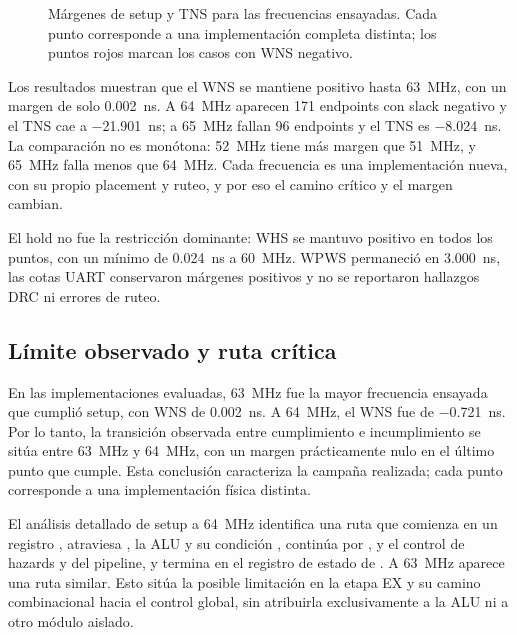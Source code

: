 \begin{figure}[H]
\begin{minipage}{0.48\textwidth}
  \end{minipage}
  \caption{Márgenes de setup y TNS para las frecuencias ensayadas. Cada punto
  corresponde a una implementación completa distinta; los puntos rojos marcan
  los casos con WNS negativo.}
  \label{fig:frecuencia-margenes}
\end{figure}

Los resultados muestran que el WNS se mantiene positivo hasta
\SI{63}{\mega\hertz}, con un margen de solo \SI{0.002}{\nano\second}. A
\SI{64}{\mega\hertz} aparecen 171 endpoints con slack negativo y el TNS cae a
\SI{-21.901}{\nano\second}; a \SI{65}{\mega\hertz} fallan 96 endpoints y el TNS
es \SI{-8.024}{\nano\second}. La comparación no es monótona: \SI{52}{\mega\hertz}
tiene más margen que \SI{51}{\mega\hertz}, y \SI{65}{\mega\hertz} falla menos que
\SI{64}{\mega\hertz}. Cada frecuencia es una implementación nueva, con su propio
placement y ruteo, y por eso el camino crítico y el margen cambian.

El hold no fue la restricción dominante: WHS se mantuvo positivo en todos los
puntos, con un mínimo de \SI{0.024}{\nano\second} a \SI{60}{\mega\hertz}. WPWS
permaneció en \SI{3.000}{\nano\second}, las cotas UART conservaron márgenes
positivos y no se reportaron hallazgos DRC ni errores de ruteo.

\subsection{Límite observado y ruta crítica}

En las implementaciones evaluadas, \SI{63}{\mega\hertz} fue la mayor frecuencia
ensayada que cumplió setup, con WNS de \SI{0.002}{\nano\second}. A
\SI{64}{\mega\hertz}, el WNS fue de \SI{-0.721}{\nano\second}. Por lo tanto,
la transición observada entre cumplimiento e incumplimiento se sitúa entre
\SI{63}{\mega\hertz} y \SI{64}{\mega\hertz}, con un margen prácticamente nulo
en el último punto que cumple. Esta conclusión caracteriza la campaña
realizada; cada punto corresponde a una implementación física distinta.

El análisis detallado de setup a \SI{64}{\mega\hertz} identifica una ruta que
comienza en un registro , atraviesa , la ALU
y su condición , continúa por ,
 y el control de hazards y del pipeline, y termina en el
registro de estado de . A \SI{63}{\mega\hertz} aparece una
ruta similar. Esto sitúa la posible limitación en la etapa EX y su camino
combinacional hacia el control global, sin atribuirla exclusivamente a la ALU
ni a otro módulo aislado.

